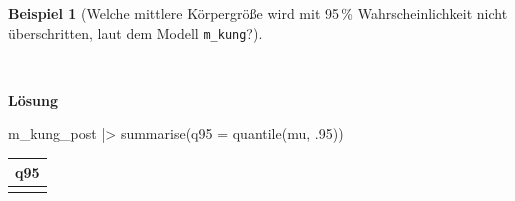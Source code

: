 \documentclass[
  ngerman,
  letterpaper,
  twoside,
  open=any]{scrbook}
\newenvironment{Shaded}{\begin{snugshade}}{\end{snugshade}}
\newcommand{\AttributeTok}[1]{\textcolor[rgb]{0.40,0.45,0.13}{#1}}
\newcommand{\DecValTok}[1]{\textcolor[rgb]{0.68,0.00,0.00}{#1}}
\newcommand{\FunctionTok}[1]{\textcolor[rgb]{0.28,0.35,0.67}{#1}}
\newcommand{\NormalTok}[1]{\textcolor[rgb]{0.00,0.23,0.31}{#1}}
\newcommand{\SpecialCharTok}[1]{\textcolor[rgb]{0.37,0.37,0.37}{#1}}
\newcounter{none} %
\theoremstyle{definition}
\newtheorem{example}{Beispiel}[chapter]
\theoremstyle{plain}
\theoremstyle{definition}
\theoremstyle{definition}
\theoremstyle{definition}
\newtheorem{example}{Beispiel}[chapter]
\theoremstyle{definition}
\theoremstyle{remark}
\begin{document}
\begin{example}[Welche mittlere Körpergröße wird mit 95\,\%
Wahrscheinlichkeit nicht überschritten, laut dem Modell
\texttt{m\_kung}?]\protect\hypertarget{exm-kung3}{}\label{exm-kung3}

~

\begin{tcolorbox}[enhanced jigsaw, arc=.35mm, bottomrule=.15mm, breakable, colback=white, colframe=quarto-callout-tip-color-frame, left=2mm, leftrule=.75mm, opacityback=0, rightrule=.15mm, toprule=.15mm]

\vspace{-3mm}\textbf{Lösung}\vspace{3mm}

\begin{Shaded}
\begin{Highlighting}[]
\NormalTok{m\_kung\_post }\SpecialCharTok{|\textgreater{}} 
  \FunctionTok{summarise}\NormalTok{(}\AttributeTok{q95 =} \FunctionTok{quantile}\NormalTok{(mu, .}\DecValTok{95}\NormalTok{))}
\end{Highlighting}
\end{Shaded}

{\def\LTcaptype{none} %
\begin{longtable}[]{@{}r@{}}
\toprule\noalign{}
q95 \\
\midrule\noalign{}
\endhead
\bottomrule\noalign{}
\endlastfoot
155 \\
\end{longtable}
}

\end{tcolorbox}

\end{example}
\end{document}
